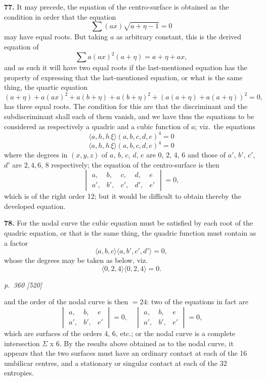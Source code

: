 \documentclass[11pt,a4paper]{book}
\begin{document}
\textbf{77.} It may precede, the equation of the centro-surface is obtained as the condition in order that the equation
\[
\sum(a x)\sqrt{a + \eta - 1} = 0
\]
may have equal roots. But taking $a$ as arbitrary constant, this is the derived equation of
\[
\sum a (a x)^2 (a + \eta) = a + \eta + a x,
\]
and as such it will have two equal roots if the last-mentioned equation has the property of expressing that the last-mentioned equation, or what is the same thing, the quartic equation
\[
(a + \eta) + a (a x)^2 + a (b + \eta) + a (b + \eta)^2 + (a (a + \eta) + a (a + \eta))^2 = 0,
\]
has three equal roots. The condition for this are that the discriminant and the subdiscriminant shall each of them vanish, and we have thus the equations to be considered as respectively a quadric and a cubic function of $a$; viz.\ the equations
\[
\langle a, h, h\,\xi \rangle (a, b, c, d, e)^4 = 0
\]
\[
\langle a, h, h\,\xi \rangle (a, b, c, d, e)^4 = 0
\]
where the degrees in $(x, y, z)$ of $a$, $b$, $c$, $d$, $e$ are $0$, $2$, $4$, $6$ and those of $a'$, $b'$, $c'$, $d'$ are $2, 4, 6$, $8$ respectively; the equation of the centro-surface is then
\[
\begin{vmatrix} a, & b, & c, & d, & e \\
a', & b', & c', & d', & e' \end{vmatrix} = 0,
\]
which is of the right order 12; but it would be difficult to obtain thereby the developed equation.

\textbf{78.} For the nodal curve the cubic equation must be satisfied by each root of the quadric equation, or that is the same thing, the quadric function must contain as a factor
\[
\langle a, b, c \rangle \langle a, b', c', d' \rangle = 0,
\]
whose the degrees may be taken as below, viz.
\[
\langle 0, 2, 4 \rangle \langle 0, 2, 4 \rangle = 0.
\]

\clearpage

\bigskip
\textit{p.~360 [520]}
\smallskip

and the order of the nodal curve is then $= 24$: two of the equations in fact are
\[
\begin{vmatrix} a, & b, & e \\
a', & b', & e' \end{vmatrix} = 0,\quad \begin{vmatrix} a, & b, & e \\
a', & b', & e' \end{vmatrix} = 0,
\]
which are surfaces of the orders 4, 6, etc.; or the nodal curve is a complete intersection $\Sigma$ x 6. By the results above obtained as to the nodal curve, it appears that the two surfaces must have an ordinary contact at each of the 16 umbilicar centres, and a stationary or singular contact at each of the 32 entropies.
\end{document}
